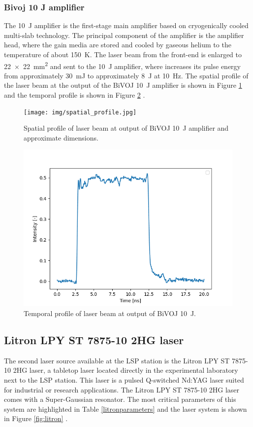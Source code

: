 \subsubsection*{Bivoj 10 J amplifier}

The \SI{10}{\joule}  amplifier is the first-stage main amplifier based on
cryogenically cooled multi-slab technology. The principal
component of the amplifier is the amplifier head, where the
gain media are stored and cooled by gaseous helium to 
the temperature of about \SI{150}{\kelvin}. The laser beam from the front-end
is enlarged to \SI{22 x 22}{\mm\squared} and sent to the \SI{10}{\joule} amplifier, where
increases its pulse energy from approximately \SI{30}{\milli\joule} to
approximately \SI{8}{\joule} at \SI{10}{\hertz}. The spatial profile of the laser beam at the output of the BiVOJ \SI{10}{\joule} amplifier is shown in Figure \ref{fig:spatialprofile} and the temporal profile is shown in Figure \ref{fig:temporalprofile} \cite{saumyabrata}.

\begin{figure}[h]
    \centering
    \texttt{[image: img/spatial\_profile.jpg]}
    \caption{Spatial profile of laser beam at output of BiVOJ \SI{10}{\joule} amplifier and approximate dimensions.}
    \label{fig:spatialprofile}
\end{figure}

\begin{figure}[h]
    \centering
    \includegraphics[width=0.6\linewidth]{img/temporal_profile_bivoj.png}
    \caption{Temporal profile of laser beam at output of BiVOJ \SI{10}{\joule}.}
    \label{fig:temporalprofile}
\end{figure}

\subsection{Litron LPY ST 7875-10 2HG laser}

The second laser source available at the LSP station is the Litron LPY ST 7875-10 2HG laser, a tabletop laser located directly in the experimental laboratory next to the LSP station. This laser is a pulsed Q-switched Nd:YAG laser suited for industrial or research applications. The Litron  LPY ST 7875-10 2HG laser comes with a Super-Gaussian resonator. The most critical parameters of this system are highlighted in Table \ref{litronparameters} and the laser system is shown in Figure \ref{fig:litron} \cite{litron}. 


